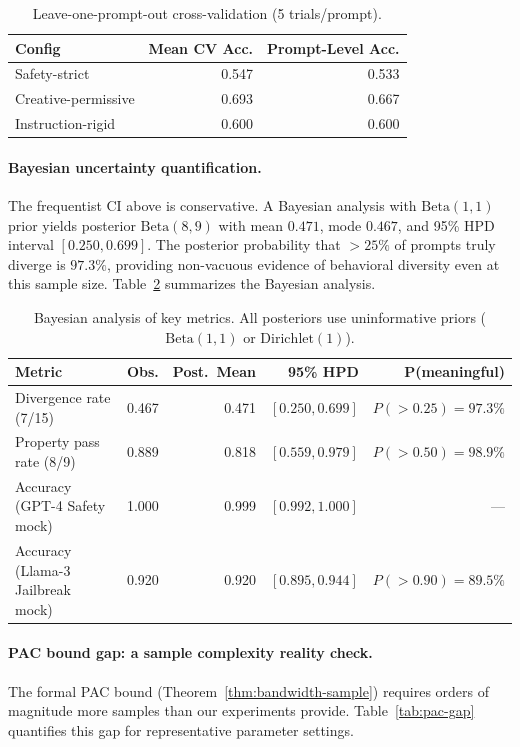 \documentclass[11pt]{article}
\begin{document}
\begin{table}[t]
\centering
\caption{Leave-one-prompt-out cross-validation (5 trials/prompt).}
\label{tab:cv}
\small
\begin{tabular}{@{}lrr@{}}
\toprule
\textbf{Config} & \textbf{Mean CV Acc.} & \textbf{Prompt-Level Acc.} \\
\midrule
Safety-strict       & 0.547 & 0.533 \\
Creative-permissive & 0.693 & 0.667 \\
Instruction-rigid   & 0.600 & 0.600 \\
\bottomrule
\end{tabular}
\end{table}

\paragraph{Bayesian uncertainty quantification.}
The frequentist CI above is conservative.  A Bayesian analysis with
$\mathrm{Beta}(1, 1)$ prior yields posterior
$\mathrm{Beta}(8, 9)$ with mean $0.471$, mode $0.467$, and
95\% HPD interval $[0.250, 0.699]$.  The posterior probability
that $>25\%$ of prompts truly diverge is $97.3\%$, providing
non-vacuous evidence of behavioral diversity even at this sample
size.  Table~\ref{tab:bayesian} summarizes the Bayesian analysis.

\begin{table}[t]
\centering
\caption{Bayesian analysis of key metrics.  All posteriors use
  uninformative priors ($\mathrm{Beta}(1,1)$ or $\mathrm{Dirichlet}(1)$).}
\label{tab:bayesian}
\small
\begin{tabular}{@{}lrrrr@{}}
\toprule
\textbf{Metric} & \textbf{Obs.} & \textbf{Post.\ Mean} & \textbf{95\% HPD} & \textbf{P(meaningful)} \\
\midrule
Divergence rate (7/15)       & 0.467 & 0.471 & $[0.250, 0.699]$ & $P(>0.25) = 97.3\%$ \\
Property pass rate (8/9)     & 0.889 & 0.818 & $[0.559, 0.979]$ & $P(>0.50) = 98.9\%$ \\
Accuracy (GPT-4 Safety mock)      & 1.000 & 0.999 & $[0.992, 1.000]$ & --- \\
Accuracy (Llama-3 Jailbreak mock) & 0.920 & 0.920 & $[0.895, 0.944]$ & $P(>0.90) = 89.5\%$ \\
\bottomrule
\end{tabular}
\end{table}

\paragraph{PAC bound gap: a sample complexity reality check.}\label{sec:sample-complexity-gap}
The formal PAC bound (Theorem~\ref{thm:bandwidth-sample}) requires
orders of magnitude more samples than our experiments provide.
Table~\ref{tab:pac-gap} quantifies this gap for representative
parameter settings.
\end{document}
